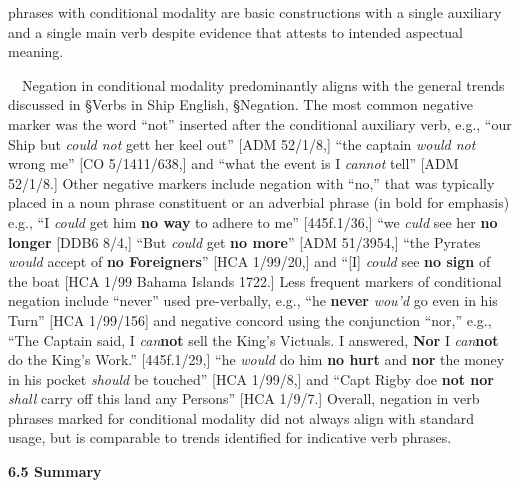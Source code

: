 \begin{styleStandard}
phrases with conditional modality are basic constructions with a single auxiliary and a single main verb despite evidence that attests to intended aspectual meaning. 
\end{styleStandard}


\begin{styleStandard}
\ \ Negation in conditional modality predominantly aligns with the general trends discussed in §Verbs in Ship English, §Negation. The most common negative marker was the word “not” inserted after the conditional auxiliary verb, e.g., “our Ship but \textit{could not} gett her keel out” [ADM 52/1/8,] “the captain \textit{would not} wrong me” [CO 5/1411/638,] and “what the event is I \textit{cannot} tell” [ADM 52/1/8.] Other negative markers include negation with “no,” that was typically placed in a noun phrase constituent or an adverbial phrase (in bold for emphasis) e.g., “I \textit{could }get him \textbf{no way} to adhere to me” [445f.1/36,] “we \textit{culd }see her \textbf{no longer}{\textquotedbl} [DDB6 8/4,] “But \textit{could} get \textbf{no more}” [ADM 51/3954,] “the Pyrates \textit{would} accept of \textbf{no Foreigners}” [HCA 1/99/20,] and “[I] \textit{could} see \textbf{no sign} of the boat{\textquotedbl} [HCA 1/99 Bahama Islands 1722.] Less frequent markers of conditional negation include “never” used pre-verbally, e.g., “he \textbf{never} \textit{wou’d} go even in his Turn” [HCA 1/99/156] and negative concord using the conjunction “nor,” e.g., “The Captain said, I \textit{can}\textbf{not} sell the King’s Victuals. I answered, \textbf{Nor} I \textit{can}\textbf{not} do the King’s Work.” [445f.1/29,] “he \textit{would} do him \textbf{no hurt} and \textbf{nor} the money in his pocket \textit{should} be touched” [HCA 1/99/8,] and “Capt Rigby doe \textbf{not nor} \textit{shall} carry off this land any Persons” [HCA 1/9/7.] Overall, negation in verb phrases marked for conditional modality did not always align with standard usage, but is comparable to trends identified for indicative verb phrases. 
\end{styleStandard}


\begin{styleStandard}
\textbf{6.5 Summary}
\end{styleStandard}


